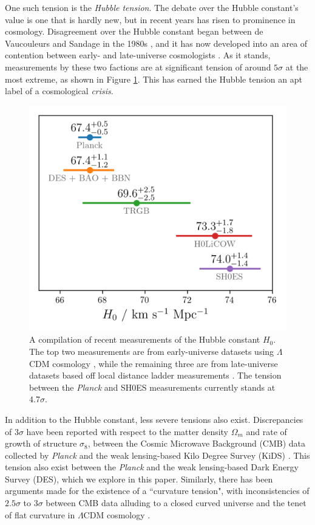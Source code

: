 \documentclass[%
 reprint,
 amsmath,amssymb,
 aps,
]{revtex4-2}
\begin{document}
One such tension is the \textit{Hubble tension}. The debate over the Hubble constant's value is one that is hardly new, but in recent years has risen to prominence in cosmology. Disagreement over the Hubble constant began between de Vaucouleurs and Sandage in the 1980s \cite{deVaucouleurs1986, Sandage1975}, and it has now developed into an area of contention between early- and late-universe cosmologists \cite{Planck2020, Abbott2018, Freedman2020, Riess2019, Wong2019}. As it stands, measurements by these two factions are at significant tension of around $5\sigma$ at the most extreme, as shown in Figure \ref{H0_tension}. This has earned the Hubble tension an apt label of a cosmological \textit{crisis}.


\begin{figure}
    \includegraphics[width=0.8\columnwidth]{../plots/H0 tension.png}
    \centering
    \caption{A compilation of recent measurements of the Hubble constant $H_0$. The top two measurements are from early-universe datasets using $\Lambda$CDM cosmology \cite{Planck2020, Abbott2018}, while the remaining three are from late-universe datasets based off local distance ladder measurements \cite{Freedman2020, Riess2019, Wong2019}. The tension between the \textit{Planck} and SH0ES measurements currently stands at $4.7 \sigma$.}
    \label{H0_tension}
\end{figure}


In addition to the Hubble constant, less severe tensions also exist. Discrepancies of $3\sigma$ have been reported with respect to the matter density $\Omega_m$ and rate of growth of structure $\sigma_8$, between the Cosmic Microwave Background (CMB) data collected by \textit{Planck} and the weak lensing-based Kilo Degree Survey (KiDS) \cite{Heymans2021}. This tension also exist between the \textit{Planck} and the weak lensing-based Dark Energy Survey (DES), which we explore in this paper. Similarly, there has been arguments made for the existence of a ``curvature tension", with inconsistencies of $2.5 \sigma$ to $3 \sigma$ between CMB data alluding to a closed curved universe and the tenet of flat curvature in $\Lambda$CDM cosmology \cite{Handley2021Closed}.
\end{document}
